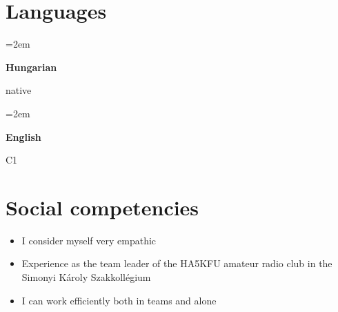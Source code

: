 \documentclass[12pt,oneside]{article} %
\newlength{\spacebox}
\newcommand{\lan}[2]{
	\noindent\hangindent=2em\hangafter=0
	\parbox{2\spacebox}{%
		\textbf{#1}} %
	 #2 \par}    %
\begin{document}
\section*{Languages}
\lan{Hungarian}{native}
\lan{English}{C1}

\section*{Social competencies}
\begin{itemize}
	\item I consider myself very empathic
	\item Experience as the team leader of the HA5KFU amateur radio club in the Simonyi Károly Szakkollégium
	\item I can work efficiently both in teams and alone
\end{itemize}
\end{document}
